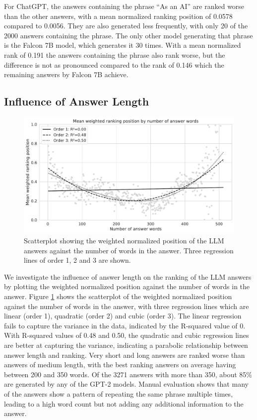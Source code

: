 For ChatGPT, the answers containing the phrase ``As an AI'' are ranked worse than the other answers, with a mean normalized ranking position of 0.0578 compared to 0.0056.
They are also generated less frequently, with only 20 of the 2000 answers containing the phrase.
The only other model generating that phrase is the Falcon 7B model, which generates it 30 times.
With a mean normalized rank of 0.191 the answers containing the phrase also rank worse, but the difference is not as pronounced compared to the rank of 0.146 which the remaining answers by Falcon 7B achieve.

\subsection{Influence of Answer Length}
\begin{figure}
    \centering
    \includegraphics[width=\textwidth]{images/weighted_position_vs_num_answer_words.pdf}
    \caption{Scatterplot showing the weighted normalized position of the LLM answers against the number of words in the answer. Three regression lines of order 1, 2 and 3 are shown.}
    \label{fig:weighted_position_vs_answer_length}
\end{figure}
We investigate the influence of answer length on the ranking of the LLM answers by plotting the weighted normalized position against the number of words in the answer.
Figure \ref{fig:weighted_position_vs_answer_length} shows the scatterplot of the weighted normalized position against the number of words in the answer, with three regression lines which are linear (order 1), quadratic (order 2) and cubic (order 3).
The linear regression fails to capture the variance in the data, indicated by the R-squared value of 0.
With R-squared values of 0.48 and 0.50, the quadratic and cubic regression lines are better at capturing the variance, indicating a parabolic relationship between answer length and ranking.
Very short and long answers are ranked worse than answers of medium length, with the best ranking answers on average having between 200 and 350 words.
Of the 3271 answers with more than 350, about 85\% are generated by any of the GPT-2 models.
Manual evaluation shows that many of the answers show a pattern of repeating the same phrase multiple times, leading to a high word count but not adding any additional information to the answer.

